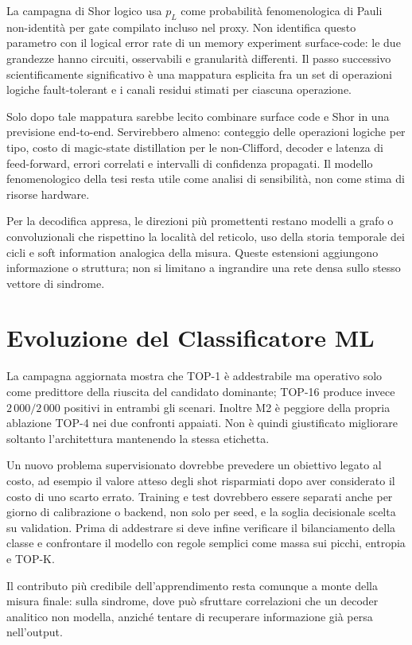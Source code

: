 \begin{onehalfspace}
La campagna di Shor logico usa $p_L$ come probabilità fenomenologica di
Pauli non-identità per gate compilato incluso nel proxy. Non identifica questo parametro con
il logical error rate di un memory experiment surface-code: le due
grandezze hanno circuiti, osservabili e granularità differenti. Il passo
successivo scientificamente significativo è una mappatura esplicita fra
un set di operazioni logiche fault-tolerant e i canali residui stimati per
ciascuna operazione.

Solo dopo tale mappatura sarebbe lecito combinare surface code e Shor in
una previsione end-to-end. Servirebbero almeno: conteggio delle operazioni
logiche per tipo, costo di magic-state distillation per le non-Clifford,
decoder e latenza di feed-forward, errori correlati e intervalli di
confidenza propagati. Il modello fenomenologico della tesi resta utile
come analisi di sensibilità, non come stima di risorse hardware.

Per la decodifica appresa, le direzioni più promettenti restano modelli a
grafo o convoluzionali che rispettino la località del reticolo, uso della
storia temporale dei cicli e soft information analogica della misura.
Queste estensioni aggiungono informazione o struttura; non si limitano a
ingrandire una rete densa sullo stesso vettore di sindrome.

\section{Evoluzione del Classificatore ML}
\label{sec:evoluzione_ml}

La campagna aggiornata mostra che TOP-1 è addestrabile ma operativo solo
come predittore della riuscita del candidato dominante; TOP-16 produce
invece $2\,000/2\,000$ positivi in entrambi gli scenari. Inoltre M2 è
peggiore della propria ablazione TOP-4 nei due confronti appaiati. Non è
quindi giustificato migliorare soltanto l'architettura mantenendo la
stessa etichetta.

Un nuovo problema supervisionato dovrebbe prevedere un obiettivo legato
al costo, ad esempio il valore atteso degli shot risparmiati dopo aver
considerato il costo di uno scarto errato. Training e test dovrebbero
essere separati anche per giorno di calibrazione o backend, non solo per
seed, e la soglia decisionale scelta su validation. Prima di addestrare
si deve infine verificare il bilanciamento della classe e confrontare il
modello con regole semplici come massa sui picchi, entropia e TOP-K.

Il contributo più credibile dell'apprendimento resta comunque a monte
della misura finale: sulla sindrome, dove può sfruttare correlazioni che
un decoder analitico non modella, anziché tentare di recuperare
informazione già persa nell'output.

\end{onehalfspace}
